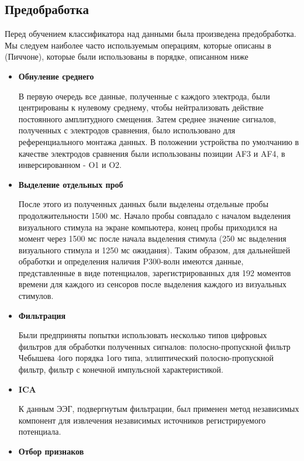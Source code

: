 \documentclass[12pt,fleqn]{article}
\begin{document}
\subsection{Предобработка}
	\par Перед обучением классификатора над данными была произведена предобработка. Мы следуем наиболее часто используемым операциям, которые описаны в (Пиччоне), которые были использованы в порядке, описанном ниже
	\begin{itemize}
	\item
	{\bf Обнуление среднего}
	\par В первую очередь все данные, полученные с каждого электрода, были центрированы к нулевому среднему, чтобы нейтрализовать действие постоянного амплитудного смещения. Затем среднее значение сигналов, полученных с электродов сравнения, было использовано для референциального монтажа данных. В положении устройства по умолчанию в качестве электродов сравнения были использованы позиции AF3 и AF4, в инверсированном - O1 и O2.
	\item
	{\bf Выделение отдельных проб}
	\par После этого из полученных данных были выделены отдельные пробы продолжительности 1500 мс. Начало пробы совпадало с началом выделения визуального стимула на экране компьютера, конец пробы приходился на момент через 1500 мс после начала выделения стимула (250 мс выделения визуального стимула и 1250 мс ожидания). Таким образом, для дальнейшей обработки и определения наличия P300-волн имеются данные, представленные в виде потенциалов, зарегистрированных для 192 моментов времени для каждого из сенсоров после выделения каждого из визуальных стимулов.
	\item
	{\bf Фильтрация}
	\par Были предприняты попытки использовать несколько типов цифровых фильтров для обработки полученных сигналов: полосно-пропускной фильтр Чебышева 4ого порядка 1ого типа, эллиптический полосно-пропускной фильтр, фильтр с конечной импульсной характеристикой.
	\item
	{\bf ICA}
	\par К данным ЭЭГ, подвергнутым фильтрации, был применен метод независимых компонент для извлечения независимых источников регистрируемого потенциала.
	\item
	{\bf Отбор признаков}

\end{itemize}
\end{document}
